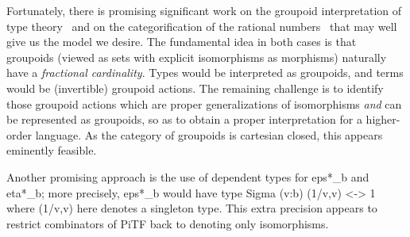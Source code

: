 \documentclass{llncs}
\begin{document}
Fortunately, there is promising significant work on the groupoid
interpretation of type theory~\cite{Hofmann96thegroupoid} and on the 
categorification of the rational numbers~\cite{math/9802029} that may well give
us the model we desire.  The fundamental idea in both cases is that groupoids
(viewed as sets with explicit isomorphisms as morphisms) naturally have a
\emph{fractional cardinality}.  Types would be interpreted as groupoids, and
terms would be (invertible) groupoid actions.  The remaining challenge is to
identify those groupoid actions which are proper generalizations of
isomorphisms \emph{and} can be represented as groupoids, so as to obtain a
proper interpretation for a higher-order language.  As the category of
groupoids is cartesian closed, this appears eminently feasible.

Another promising approach is the use of dependent types for {{eps*_b}} and
{{eta*_b}}; more precisely, {{eps*_b}} would have type 
{{Sigma (v:b) (1/v,v) <-> 1}} where {{(1/v,v)}} here denotes a singleton type.
This extra precision appears to restrict combinators of {{PiTF}} back to
denoting only isomorphisms.

{\small
 

}
\end{document}
